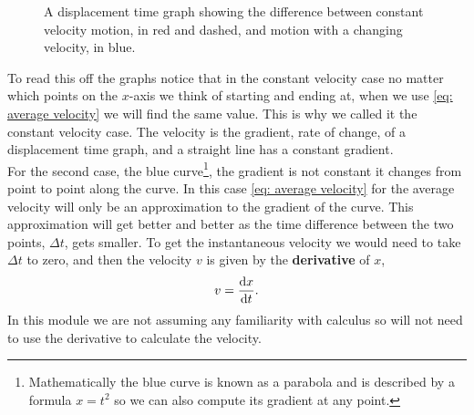 \begin{figure}[ht]
    \centering
    \caption{A displacement time graph showing the difference between constant velocity motion, in red and dashed, and motion with a changing velocity, in blue.}
    \label{fig: displacement time graph 1}
\end{figure}

To read this off the graphs notice that in the constant velocity case no matter which points on the $x$-axis we think of starting and ending at, when we use \cref{eq: average velocity} we will find the same value. This is why we called it the constant velocity case. The velocity is the gradient, rate of change, of a displacement time graph, and a straight line has a constant gradient.\\

For the second case, the blue curve\footnote{Mathematically the blue curve is known as a parabola and is described by a formula $x=t^{2}$ so we can also compute its gradient at any point.}, the gradient is not constant it changes from point to point along the curve. In this case \cref{eq: average velocity} for the average velocity will only be an approximation to the gradient of the curve. This approximation will get better and better as the time difference between the two points, $\Delta t$, gets smaller. To get the instantaneous velocity we would need to take $\Delta t$ to zero, and then the velocity $v$ is given by the \textbf{derivative} of $x$,
\begin{equation*}
    v=\frac{\mathrm{d} x}{\mathrm{d} t}.
\end{equation*}
In this module we are not assuming any familiarity with calculus so will not need to use the derivative to calculate the velocity. 

